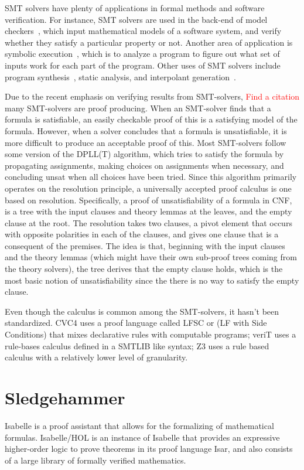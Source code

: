 \documentclass{article}
\begin{document}
	SMT solvers have plenty of applications in formal methods 
	and software verification. For instance, SMT solvers are used 
	in the back-end of model checkers~\cite{DBLP:books/daglib/0020348}, 
	which input mathematical 
	models of a software system, and verify whether they 
	satisfy a particular property or not. Another area of 
	application is symbolic
	execution~\cite{DBLP:journals/csur/BaldoniCDDF18}, 
	which is to analyze a 
	program to figure out what set of inputs work for each 
	part of the program. Other uses of SMT solvers include 
	program synthesis~\cite{synth}, static analysis, 
	and interpolant generation~\cite{DBLP:journals/corr/abs-1111-5652}.
	
	Due to the recent emphasis on verifying results from SMT-solvers,
	\textcolor{red}{Find a citation}
	many SMT-solvers are proof producing. When an SMT-solver finds 
	that a formula is satisfiable, an easily checkable proof of this is 
	a satisfying model of the formula. However, when a solver 
	concludes that a formula is unsatisfiable, it is more difficult 
	to produce an acceptable proof of this. Most SMT-solvers 
	follow some version of the DPLL(T) algorithm, which tries
	to satisfy the formula by propagating assignments, making 
	choices on assignments when necessary, and concluding unsat
	when all choices have been tried. Since this algorithm 
	primarily operates on the resolution principle, 
	a universally accepted proof calculus is one based 
	on resolution. Specifically, a proof of unsatisfiability 
	of a formula in CNF, is a tree with the input 
	clauses and theory lemmas at the leaves, and the empty 
	clause at the root. The resolution takes two clauses, 
	a pivot element that occurs with opposite polarities 
	in each of the clauses, and gives one clause that is 
	a consequent of the premises. The idea is that, beginning 
	with the input clauses and the theory lemmas (which might 
	have their own sub-proof trees coming from the theory solvers), 
	the tree derives that the empty clause holds, which is the 
	most basic notion of unsatisfiability since the there 
	is no way to satisfy the empty clause.
	
	Even though the calculus is common among the SMT-solvers, 
	it hasn't been standardized. CVC4 uses a proof language called
	LFSC or (LF with Side Conditions) that mixes declarative rules
	with computable programs; veriT uses a rule-bases calculus
	defined in a SMTLIB like syntax; Z3 uses a rule based calculus 
	with a relatively lower level of granularity. 
	
\section{Sledgehammer}
\label{sec:hammer}
	Isabelle is a proof assistant that allows for the formalizing of mathematical 
	formulas. Isabelle/HOL is an instance of Isabelle that 
	provides an expressive higher-order logic to prove theorems 
	in its proof language Isar, and also consists of a large 
	library of formally verified mathematics. 
	
\end{document}
